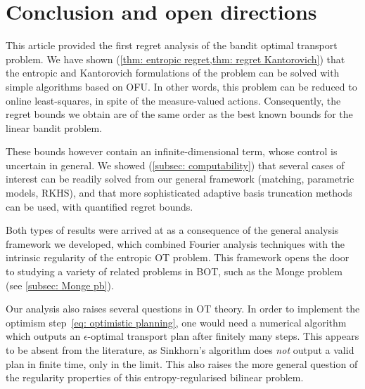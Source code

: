 
\section{Conclusion and open directions}\label{sec: directions}

This article provided the first regret analysis of the bandit optimal transport problem. We have shown (\cref{thm: entropic regret,thm: regret Kantorovich}) that the entropic and Kantorovich formulations of the problem can be solved with simple algorithms based on OFU. In other words, this problem can be reduced to online least-squares, in spite of the measure-valued actions. Consequently, the regret bounds we obtain are of the same order as the best known bounds for the linear bandit problem. 

These bounds however contain an infinite-dimensional term, whose control is uncertain in general. We showed (\cref{subsec: computability}) that several cases of interest can be readily solved from our general framework (matching, parametric models, RKHS), and that more sophisticated adaptive basis truncation methods can be used, with quantified regret bounds.

Both types of results were arrived at as a consequence of the general analysis framework we developed, which combined Fourier analysis techniques with the intrinsic regularity of the entropic OT problem. This framework opens the door to studying a variety of related problems in BOT, such as the Monge problem (see \cref{subsec: Monge pb}).

Our analysis also raises several questions in OT theory. In order to implement the optimism step~\eqref{eq: optimistic planning}, one would need a numerical algorithm which outputs an $\epsilon$-optimal transport plan after finitely many steps. This appears to be absent from the literature, as Sinkhorn's algorithm does \emph{not} output a valid plan in finite time, only in the limit. This also raises the more general question of the regularity properties of this entropy-regularised bilinear problem.
